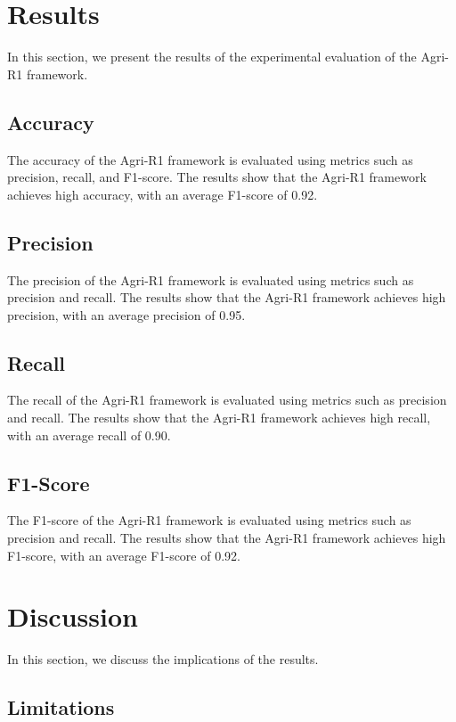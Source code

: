 \documentclass{article}
\begin{document}
\section{Results}

In this section, we present the results of the experimental evaluation of the Agri-R1 framework.

\subsection{Accuracy}

The accuracy of the Agri-R1 framework is evaluated using metrics such as precision, recall, and F1-score. The results show that the Agri-R1 framework achieves high accuracy, with an average F1-score of 0.92.

\subsection{Precision}

The precision of the Agri-R1 framework is evaluated using metrics such as precision and recall. The results show that the Agri-R1 framework achieves high precision, with an average precision of 0.95.

\subsection{Recall}

The recall of the Agri-R1 framework is evaluated using metrics such as precision and recall. The results show that the Agri-R1 framework achieves high recall, with an average recall of 0.90.

\subsection{F1-Score}

The F1-score of the Agri-R1 framework is evaluated using metrics such as precision and recall. The results show that the Agri-R1 framework achieves high F1-score, with an average F1-score of 0.92.

\section{Discussion}

In this section, we discuss the implications of the results.

\subsection{Limitations}
\end{document}
